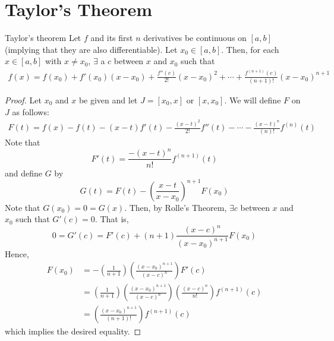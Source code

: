 \section{Taylor's Theorem}
\begin{theorem}{Taylor's theorem}{}
    Let $f$ and its first $n$ derivatives be continuous on $[a, b]$ (implying that they are also differentiable). Let $x_0 \in [a, b]$. Then, for each $x \in [a, b]$ with $x \neq x_0$, $\exists$ a $c$ between $x$ and $x_0$ such that
    \begin{align*}
        f(x) = f(x_0) + f'(x_0)(x - x_0) + \frac{f''(c)}{2!}(x - x_0)^2 + \cdots + \frac{f^{(n + 1)}(c)}{(n + 1)!}(x - x_0)^{n + 1}
    \end{align*}
\end{theorem}
\begin{proof}
    Let $x_0$ and $x$ be given and let $J = [x_0, x]$ or $[x, x_0]$. We will define $F$ on $J$ as follows:
    \begin{align*}
        F(t) = f(x) - f(t) - (x - t)f'(t) - \frac{(x - t)^2}{2!}f''(t) - \cdots - \frac{(x - t)^{n}}{(n)!}f^{(n)}(t)
    \end{align*}
    Note that $$F'(t) = \frac{-(x - t)^n}{n!} f^{(n + 1)} (t) $$ and define $G$ by $$G(t) = F(t) - \left(\frac{x - t}{x - x_0}\right)^{n + 1} F(x_0)$$
    Note that $G(x_0) = 0 = G(x)$. Then, by Rolle's Theorem, $\exists c$ between $x$ and $x_0$ such that $G'(c) = 0$. That is, $$0 = G'(c) = F'(c) + (n + 1) \frac{(x - c)^n}{(x - x_0)^{n + 1}} F(x_0)$$ 
    Hence, 
    \begin{align*}
        F(x_0) &= - \left(\frac{1}{n + 1}\right) \left(\frac{(x - x_0)^{n + 1}}{(x - c)^n}\right) F'(c) \\
        &= \left(\frac{1}{n + 1}\right) \left(\frac{(x - x_0)^{n + 1}}{(x - c)^n}\right) \left(\frac{(x - c)^n}{n!}\right) f^{(n + 1)} (c) \\
        &= \left(\frac{(x - x_0)^{n + 1}}{(n + 1)!}\right) f^{(n + 1)} (c)
    \end{align*}
    which implies the desired equality.
\end{proof}